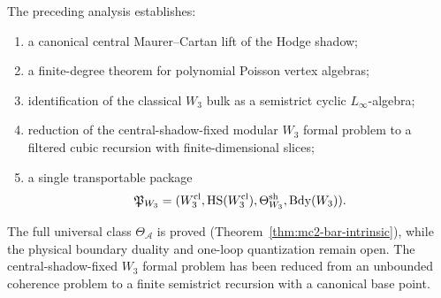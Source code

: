The preceding analysis establishes:
\begin{enumerate}[label=\textup{(\arabic*)}]
 \item a canonical central Maurer--Cartan lift of the Hodge shadow;
 \item a finite-degree theorem for polynomial Poisson vertex algebras;
 \item identification of the classical $W_3$ bulk as a semistrict cyclic $L_\infty$-algebra;
 \item reduction of the central-shadow-fixed modular $W_3$ formal problem to a filtered cubic recursion with finite-dimensional slices;
 \item a single transportable package
 \[
 \mathfrak P_{W_3}=(W_3^{\mathrm{cl}},\operatorname{HS}(W_3^{\mathrm{cl}}),\Theta^{\mathrm{sh}}_{W_3},\operatorname{Bdy}(W_3)).
 \]
\end{enumerate}
The full universal class $\Theta_{\mathcal A}$ is proved
(Theorem~\ref{thm:mc2-bar-intrinsic}), while the physical boundary
duality and one-loop quantization remain open. The central-shadow-fixed
$W_3$ formal problem has been reduced from an unbounded coherence
problem to a finite semistrict recursion with a canonical base point.
